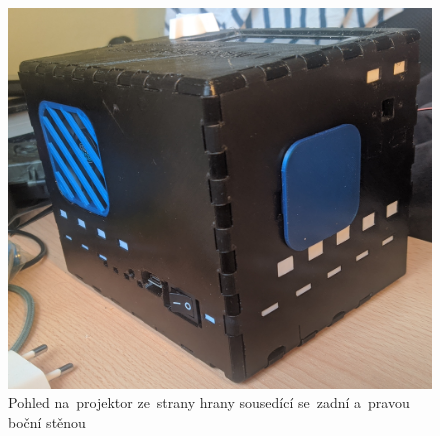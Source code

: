 \begin{figure}[htb]
  \centering
  \includegraphics[width=1\textwidth]{img/hw_sides_backleft.jpg}
  \caption{\label{fig:hw_sides_backleft.jpg} Pohled na~projektor ze~strany hrany sousedící se~zadní a~pravou boční stěnou}
\end{figure}


